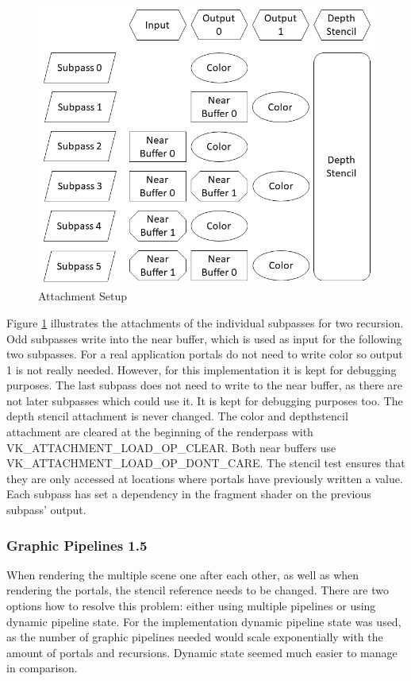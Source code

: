 \begin{figure}[h]
	\includegraphics[width=\linewidth]{images/attachmentsetup.png}
	\caption{Attachment Setup}
	\label{fig:attachments}
\end{figure}

Figure \ref{fig:attachments} illustrates the attachments of the individual subpasses for two recursion. Odd subpasses write into the near buffer, which is used as input for the following two subpasses. For a real application portals do not need to write color so output 1 is not really needed. However, for this implementation it is kept for debugging purposes.
The last subpass does not need to write to the near buffer, as there are not later subpasses which could use it. It is kept for debugging purposes too. The depth stencil attachment is never changed. The color and depthstencil attachment are cleared at the beginning of the renderpass with VK\_ATTACHMENT\_LOAD\_OP\_CLEAR. Both near buffers use VK\_ATTACHMENT\_LOAD\_OP\_DONT\_CARE. The stencil test ensures that they are only accessed at locations where portals have previously written a value. Each subpass has set a dependency in the fragment shader on the previous subpass' output.


\subsubsection{Graphic Pipelines 1.5}
When rendering the multiple scene one after each other, as well as when rendering the portals, the stencil reference needs to be changed. There are two options how to resolve this problem: either using multiple pipelines or using dynamic pipeline state. For the implementation dynamic pipeline state was used, as the number of graphic pipelines needed would scale exponentially with the amount of portals and recursions. Dynamic state seemed much easier to manage in comparison.


